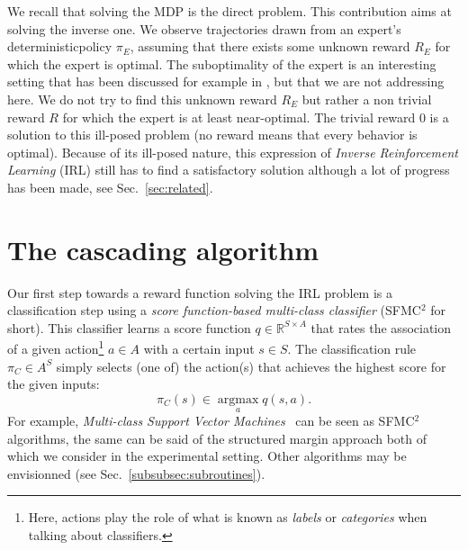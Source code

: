 \documentclass[smallextended]{svjour3}
\newcommand{\argmax}{\operatorname*{argmax}} %
\begin{document}
We recall that solving the MDP is the direct problem. This contribution aims at solving the inverse one. We observe trajectories drawn from an expert's deterministic\footnotemark[\value{footnote}] policy $\pi_E$, assuming that there exists some unknown reward $R_E$ for which the expert is optimal. The suboptimality of the expert is an interesting setting that has been discussed for example in \cite{melo2010analysis,syed2010reduction}, but that we are not addressing here. We do not try to find this unknown reward $R_E$ but rather a non trivial reward $R$ for which the expert is at least near-optimal. The trivial reward $0$ is a solution to this ill-posed problem (no reward means that every behavior is optimal). Because of its ill-posed nature, this expression of \emph{Inverse Reinforcement Learning} (IRL) still has to find a satisfactory solution although a lot of progress has been made, see Sec.~\ref{sec:related}.
\section{The cascading algorithm}
\label{sec:algo}
Our first step towards a reward function solving the IRL problem is a classification step using a \emph{score function-based multi-class classifier} (SFMC$^2$ for short). This classifier learns a score function $q\in\mathbb{R}^{S\times A}$ that rates the association of a given action\footnote{Here, actions play the role of what is known as {\it labels} or {\it categories} when talking about classifiers.} $a\in A$ with a certain input $s\in S$. The classification rule $\pi_C\in A^S$ simply selects (one of) the action(s) that achieves the highest score for the given inputs:
\begin{equation}
  \label{eq:greedy2}
\pi_C(s) \in \argmax_a q(s,a).
\end{equation}
For example, \emph{Multi-class Support Vector Machines}~\cite{guermeur2011generic} can be seen as SFMC$^2$ algorithms, the same can be said of the structured margin approach \cite{taskar2005learning} both of which we consider in the experimental setting. Other algorithms may be envisionned (see Sec.~\ref{subsubsec:subroutines}). 
\end{document}
